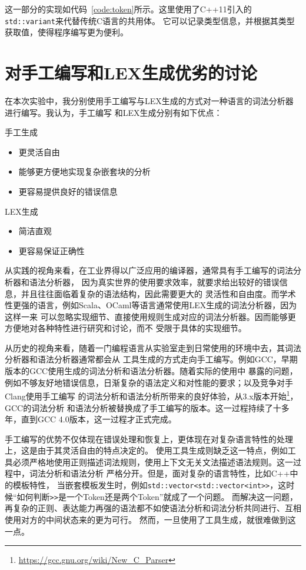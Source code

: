 \documentclass[a4paper,twoside]{article}
\begin{document}
\begin{spacing}{1.2}
这一部分的实现如代码~\ref{code:token}所示。这里使用了C++11引入的\texttt{std::variant}来代替传统C语言的共用体。
它可以记录类型信息，并根据其类型获取值，使得程序编写更为便利。


\section{对手工编写和LEX生成优劣的讨论}

在本次实验中，我分别使用手工编写与LEX生成的方式对一种语言的词法分析器进行编写。我认为，手工编写
和LEX生成分别有如下优点：

手工生成
\begin{itemize}
	\item 更灵活自由
	\item 能够更方便地实现复杂嵌套块的分析
	\item 更容易提供良好的错误信息
\end{itemize}

LEX生成
\begin{itemize}
	\item 简洁直观
	\item 更容易保证正确性
\end{itemize}

从实践的视角来看，在工业界得以广泛应用的编译器，通常具有手工编写的词法分析器和语法分析器，
因为真实世界的使用要求效率，就要求给出较好的错误信息，并且往往面临着复杂的语法结构，因此需要更大的
灵活性和自由度。而学术性更强的语言，例如Scala、OCaml等语言通常使用LEX生成的词法分析器，因为这样一来
可以忽略实现细节、直接使用规则生成对应的词法分析器。因而能够更方便地对各种特性进行研究和讨论，而不
受限于具体的实现细节。

从历史的视角来看，随着一门编程语言从实验室走到日常使用的环境中去，其词法分析器和语法分析器通常都会从
工具生成的方式走向手工编写。例如GCC，早期版本的GCC使用生成的词法分析和语法分析器。随着实际的使用中
暴露的问题，例如不够友好地错误信息，日渐复杂的语法定义和对性能的要求；以及竞争对手Clang使用手工编写
的词法分析和语法分析所带来的良好体验，从3.x版本开始\footnote[1]{\url{https://gcc.gnu.org/wiki/New_C_Parser}}，GCC的词法分析
和语法分析被替换成了手工编写的版本。这一过程持续了十多年，直到GCC 4.0版本，这一过程才正式完成。

手工编写的优势不仅体现在错误处理和恢复上，更体现在对复杂语言特性的处理上，这是由于其灵活自由的特点决定的。
使用工具生成则缺乏这一特点，例如工具必须严格地使用正则描述词法规则，使用上下文无关文法描述语法规则。这一过程中，词法分析和语法分析
严格分开。但是，面对复杂的语言特性，比如C++中的模板特性，
当嵌套模板发生时，例如\texttt{std::vector<std::vector<int>>}，这时候“如何判断\texttt{>>}是一个Token还是两个Token”就成了一个问题。
而解决这一问题，再复杂的正则、表达能力再强的语法都不如使语法分析和词法分析共同进行、互相使用对方的中间状态来的更为可行。
然而，一旦使用了工具生成，就很难做到这一点。


\end{spacing}
\end{document}
